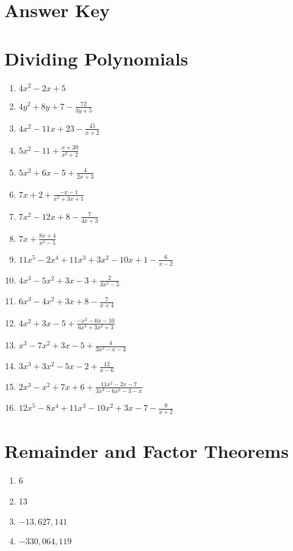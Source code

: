 \newpage

\section{Answer Key}

\section*{Dividing Polynomials}

\begin{enumerate}
    \item $4x^2-2x+5$
    \item $4y^2+8y+7-\frac{72}{3y+5}$
    \item $4x^2 - 11x + 23 - \frac{45}{x+2}$
    \item $5x^2 - 11 + \frac{x+20}{x^2+2}$
    \item $5x^2 + 6x - 5 + \frac{4}{2x+3}$
    \item $7x + 2 + \frac{-x-1}{x^2+3x+1}$
    \item $7x^2-12x+8-\frac{7}{4x+3}$
    \item $7x+\frac{8x+4}{x^2-5}$
    \item $11x^5-2x^4+11x^3+3x^2-10x+1-\frac{6}{x-2}$
    \item $4x^3-5x^2+3x-3+\frac{2}{3x^2-5}$
    \item $6x^3-4x^2+3x+8-\frac{7}{x+4}$
    \item $4x^2+3x-5+\frac{-x^2-6x-10}{6x^3+3x^2+3}$
    \item $x^3-7x^2+3x-5+\frac{4}{3x^2-x-4}$
    \item $3x^3+3x^2-5x-2+\frac{12}{x-6}$
    \item $2x^3-x^2+7x+6+\frac{11x^2-2x-7}{3x^3-6x^2-3-x}$
    \item $12x^5-8x^4+11x^3-10x^2+3x-7-\frac{9}{x+2}$
\end{enumerate}

\section*{Remainder and Factor Theorems}

\begin{enumerate}
	\item 6
	\item 13
	\item $-13,627,141$
    \item $-330,064,119$
\end{enumerate}
